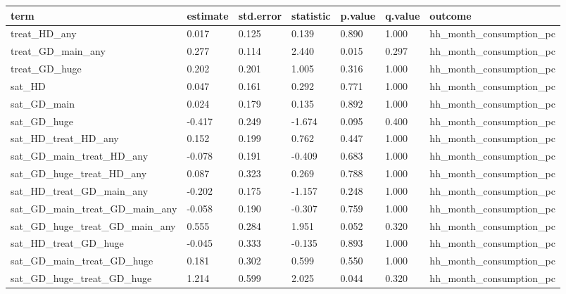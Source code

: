 \begin{tabular}{lllllll}
\toprule
term & estimate & std.error & statistic & p.value & q.value & outcome
 \\
\midrule
treat\_HD\_any & 0.017 & 0.125 & 0.139 & 0.890 & 1.000 & hh\_month\_consumption\_pc \\
treat\_GD\_main\_any & 0.277 & 0.114 & 2.440 & 0.015 & 0.297 & hh\_month\_consumption\_pc \\
treat\_GD\_huge & 0.202 & 0.201 & 1.005 & 0.316 & 1.000 & hh\_month\_consumption\_pc \\
sat\_HD & 0.047 & 0.161 & 0.292 & 0.771 & 1.000 & hh\_month\_consumption\_pc \\
sat\_GD\_main & 0.024 & 0.179 & 0.135 & 0.892 & 1.000 & hh\_month\_consumption\_pc \\
sat\_GD\_huge & -0.417 & 0.249 & -1.674 & 0.095 & 0.400 & hh\_month\_consumption\_pc \\
sat\_HD\_treat\_HD\_any & 0.152 & 0.199 & 0.762 & 0.447 & 1.000 & hh\_month\_consumption\_pc \\
sat\_GD\_main\_treat\_HD\_any & -0.078 & 0.191 & -0.409 & 0.683 & 1.000 & hh\_month\_consumption\_pc \\
sat\_GD\_huge\_treat\_HD\_any & 0.087 & 0.323 & 0.269 & 0.788 & 1.000 & hh\_month\_consumption\_pc \\
sat\_HD\_treat\_GD\_main\_any & -0.202 & 0.175 & -1.157 & 0.248 & 1.000 & hh\_month\_consumption\_pc \\
sat\_GD\_main\_treat\_GD\_main\_any & -0.058 & 0.190 & -0.307 & 0.759 & 1.000 & hh\_month\_consumption\_pc \\
sat\_GD\_huge\_treat\_GD\_main\_any & 0.555 & 0.284 & 1.951 & 0.052 & 0.320 & hh\_month\_consumption\_pc \\
sat\_HD\_treat\_GD\_huge & -0.045 & 0.333 & -0.135 & 0.893 & 1.000 & hh\_month\_consumption\_pc \\
sat\_GD\_main\_treat\_GD\_huge & 0.181 & 0.302 & 0.599 & 0.550 & 1.000 & hh\_month\_consumption\_pc \\
sat\_GD\_huge\_treat\_GD\_huge & 1.214 & 0.599 & 2.025 & 0.044 & 0.320 & hh\_month\_consumption\_pc \\
\bottomrule
\end{tabular}
